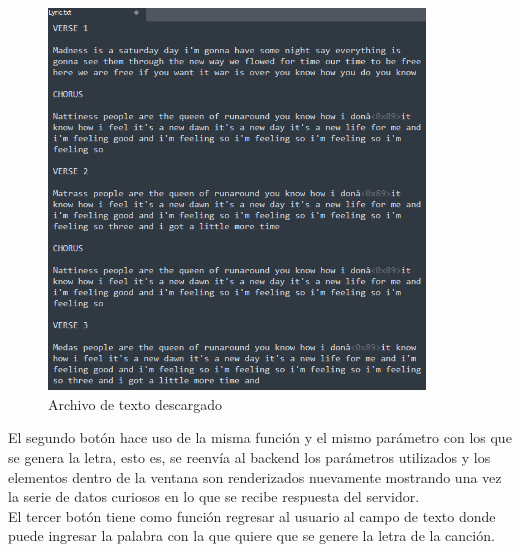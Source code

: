 \documentclass[12pt, a4paper, titlepage]{article}
\begin{document}
	\begin{figure}[H]
		\includegraphics[width=10cm]{./Imagenes/AplicacionWeb/Archivo.png}
		\centering 
		\caption{Archivo de texto descargado}
	\end{figure}	
	El segundo botón hace uso de la misma función y el mismo parámetro con los que se genera la letra, esto es, se reenvía al backend los parámetros utilizados y los elementos dentro de la ventana son renderizados nuevamente mostrando una vez la serie de datos curiosos en lo que se recibe respuesta del servidor.\\
	El tercer botón tiene como función regresar al usuario al campo de texto donde puede ingresar la palabra con la que quiere que se genere la letra de la canción.
	\newpage
\end{document}
